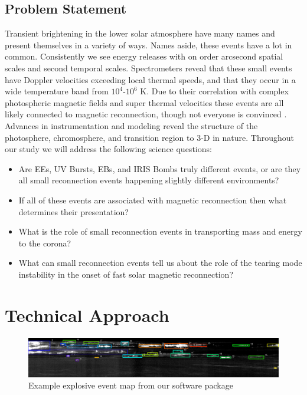 \documentclass[]{aastex6}
\begin{document}
	
	
	\subsection{Problem Statement} 
	Transient brightening in the lower solar atmosphere have many names and present themselves in a variety of ways. Names aside, these events have a lot in common.  Consistently we see energy releases with on order arcsecond spatial scales and second temporal scales. Spectrometers reveal that these small events have Doppler velocities exceeding local thermal speeds, and that they occur in a wide temperature band from $10^4$-$10^6$ K.  Due to their correlation with complex photospheric magnetic fields and super thermal velocities these events are all likely connected to magnetic reconnection, though not everyone is convinced \citep{Judge2015}. Advances in instrumentation and modeling reveal the structure of the photosphere, chromosphere, and transition region to 3-D in nature.  Throughout our study we will address the following science questions:
	
		\begin{itemize}
	
			\item Are EEs, UV Bursts, EBs, and IRIS Bombs truly different events, or are they all small reconnection events happening slightly different environments?
			\item If all of these events are associated with magnetic reconnection then what determines their presentation?
			\item What is the role of small reconnection events in transporting mass and energy to the corona?
			\item What can small reconnection events tell us about the role of the tearing mode instability in the onset of fast solar magnetic reconnection?
			
			
		\end{itemize}
		


\section{Technical Approach} 


\begin{figure}
	\label{fig:eemap}
	\caption{Example explosive event map from our software package}
	\centerline{\includegraphics[scale=.5]{./NESSF_img/ee_map.eps}}
	
\end{figure}
\end{document}
